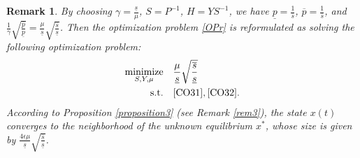 \documentclass[journal,twoside,web]{ieeecolor}
\newtheorem{remark}	      [theorem]{Remark}
\begin{document}
\begin{remark}\label{rem4}
By choosing $\gamma=\frac{\underline{s}}{\mu}$, $S=P^{-1}$, $H=YS^{-1}$, we have $\underline{p}=\frac{1}{\overline{s}}$, $\overline{p}=\frac{1}{\overline{s}}$, and $\frac{1}{\gamma}\sqrt{\frac{\overline{p}}{\underline{p}}}=\frac{\mu}{\underline{s}}\sqrt{\frac{\overline{s}}{\underline{s}}}$. Then the optimization problem \eqref{OPr} is reformulated as solving the following optimization problem:
\begin{align}
\underset{S, Y, \mu}{\text{minimize}} 
\quad & \frac{\mu}{\underline{s}}\sqrt{\frac{\overline{s}}{\underline{s}}}\nonumber\\
\text{s.t.} \quad & \eqref{CO31}, \eqref{CO32}.\label{OPC}
\end{align}
According to Proposition \ref{proposition3} (see Remark \ref{rem3}), the state $x(t)$ converges to the neighborhood of the unknown equilibrium $x^*$, whose size is given by $\frac{4\epsilon\mu}{\underline{s}}\sqrt{\frac{\overline{s}}{\underline{s}}}$.
\end{remark}
\end{document}
